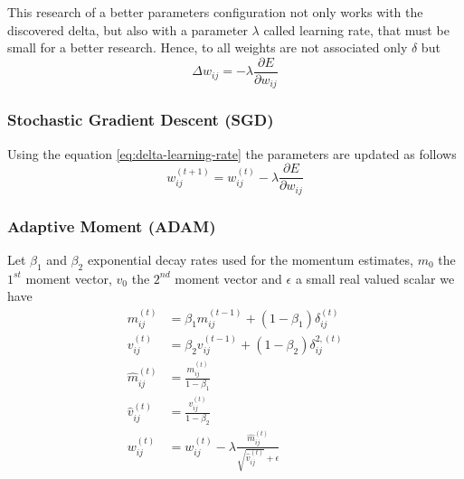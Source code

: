 \begin{figure}[!ht]
{
	}
	\label{fig:dummy}
\end{figure}

This research of a better parameters configuration not only works with the discovered delta, but also with a parameter $\lambda$ called learning rate, that must be small for a better research. Hence, to all weights are not associated only $\delta$ but 
\begin{equation}
	\Delta{w_{ij}} = -\lambda\frac{\partial{E}}{\partial{w_{ij}}}
\end{equation}\label{eq:delta-learning-rate}

\subsubsection*{Stochastic Gradient Descent (SGD)}
Using the equation \ref{eq:delta-learning-rate} the parameters are updated as follows
\begin{equation}
	w_{ij}^{(t + 1)} = w_{ij}^{(t)} - \lambda\frac{\partial{E}}{\partial{w_{ij}}} 
\end{equation}

\subsubsection*{Adaptive Moment (ADAM)}
Let $\beta_1$ and $\beta_2$ exponential decay rates used for the momentum estimates, $m_0$ the $1^{st}$ moment vector, $v_0$ the $2^{nd}$ moment vector and $\epsilon$ a small real valued scalar we have 
\begin{align}
	m_{ij}^{(t)} &= \beta_1m_{ij}^{(t-1)} + (1 - \beta_1)\delta_{ij}^{(t)} \\
	v_{ij}^{(t)} &= \beta_2v_{ij}^{(t-1)} + (1 - \beta_2)\delta_{ij}^{2,  (t)} \\
	\hat{m}_{ij}^{(t)} &= \frac{m_{ij}^{(t)}}{1 - \beta_{1}} \\
	\hat{v}_{ij}^{(t)} &= \frac{v_{ij}^{(t)}}{1 - \beta_{2}} \\
	w_{ij}^{(t)} &= w_{ij}^{(t)} - \lambda\frac{\hat{m}_{ij}^{(t)}}{\sqrt{\hat{v}_{ij}^{(t)}} + \epsilon}
\end{align}

